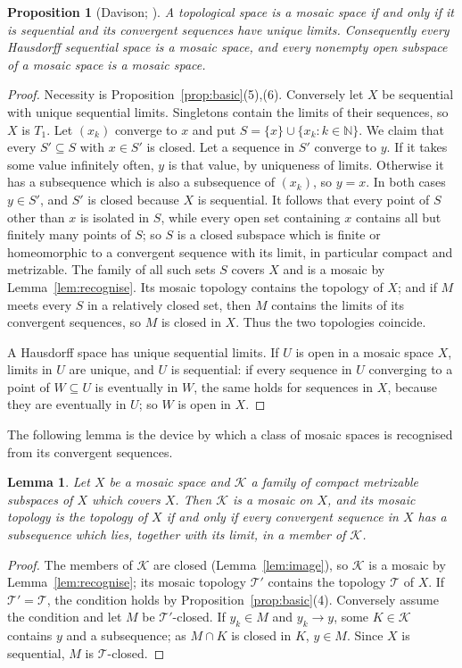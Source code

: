 \documentclass[11pt]{amsart}
\newtheorem{lemma}[theorem]{Lemma}
\newtheorem{proposition}[theorem]{Proposition}
\theoremstyle{definition}
\theoremstyle{remark}
\newcommand{\N}{\mathbb{N}}
\newcommand{\cK}{\mathcal{K}}
\newcommand{\cT}{\mathcal{T}}
\numberwithin{equation}{section}
\begin{document}
\begin{proposition}[Davison; {\cite[Theorem~1.6]{lavallee64}}]\label{prop:char}
A topological space is a mosaic space if and only if it is sequential and its convergent sequences have unique limits. Consequently every Hausdorff sequential space is a mosaic space, and every nonempty open subspace of a mosaic space is a mosaic space.
\end{proposition}
\begin{proof}
Necessity is Proposition~\ref{prop:basic}(5),(6). Conversely let $X$ be sequential with unique sequential limits. Singletons contain the limits of their sequences, so $X$ is $T_1$. Let $(x_k)$ converge to $x$ and put $S=\{x\}\cup\{x_k:k\in\N\}$. We claim that every $S'\subseteq S$ with $x\in S'$ is closed. Let a sequence in $S'$ converge to $y$. If it takes some value infinitely often, $y$ is that value, by uniqueness of limits. Otherwise it has a subsequence which is also a subsequence of $(x_k)$, so $y=x$. In both cases $y\in S'$, and $S'$ is closed because $X$ is sequential. It follows that every point of $S$ other than $x$ is isolated in $S$, while every open set containing $x$ contains all but finitely many points of $S$; so $S$ is a closed subspace which is finite or homeomorphic to a convergent sequence with its limit, in particular compact and metrizable. The family of all such sets $S$ covers $X$ and is a mosaic by Lemma~\ref{lem:recognise}. Its mosaic topology contains the topology of $X$; and if $M$ meets every $S$ in a relatively closed set, then $M$ contains the limits of its convergent sequences, so $M$ is closed in $X$. Thus the two topologies coincide.

A Hausdorff space has unique sequential limits. If $U$ is open in a mosaic space $X$, limits in $U$ are unique, and $U$ is sequential: if every sequence in $U$ converging to a point of $W\subseteq U$ is eventually in $W$, the same holds for sequences in $X$, because they are eventually in $U$; so $W$ is open in $X$.
\end{proof}

The following lemma is the device by which a class of mosaic spaces is recognised from its convergent sequences.

\begin{lemma}\label{lem:generate}
Let $X$ be a mosaic space and $\cK$ a family of compact metrizable subspaces of $X$ which covers $X$. Then $\cK$ is a mosaic on $X$, and its mosaic topology is the topology of $X$ if and only if every convergent sequence in $X$ has a subsequence which lies, together with its limit, in a member of $\cK$.
\end{lemma}
\begin{proof}
The members of $\cK$ are closed (Lemma~\ref{lem:image}), so $\cK$ is a mosaic by Lemma~\ref{lem:recognise}; its mosaic topology $\cT'$ contains the topology $\cT$ of $X$. If $\cT'=\cT$, the condition holds by Proposition~\ref{prop:basic}(4). Conversely assume the condition and let $M$ be $\cT'$-closed. If $y_k\in M$ and $y_k\to y$, some $K\in\cK$ contains $y$ and a subsequence; as $M\cap K$ is closed in $K$, $y\in M$. Since $X$ is sequential, $M$ is $\cT$-closed.
\end{proof}
\end{document}
